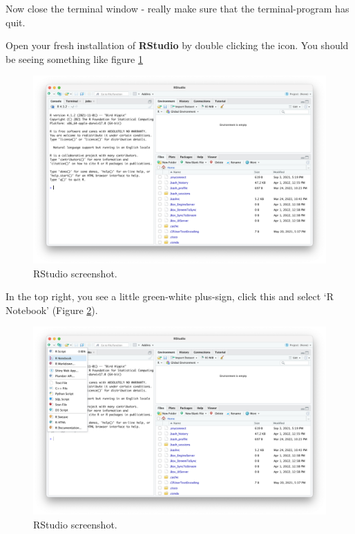 \documentclass[
]{book}
\begin{document}
Now close the terminal window - really make sure that the terminal-program has quit.

Open your fresh installation of \textbf{RStudio} by double clicking the icon. You should be seeing something like figure \ref{fig:rstudioscreenshot}

\begin{figure}[H]

{\centering \includegraphics[width=0.85\linewidth]{img/rstudio-screenshot} 

}

\caption{RStudio screenshot.}\label{fig:rstudioscreenshot}
\end{figure}

In the top right, you see a little green-white plus-sign, click this and select `R Notebook' (Figure \ref{fig:rstudioscreenshotcreatenotebook}).

\begin{figure}[H]

{\centering \includegraphics[width=0.85\linewidth]{img/rstudio-screenshot-create-notebook} 

}

\caption{RStudio screenshot.}\label{fig:rstudioscreenshotcreatenotebook}
\end{figure}
\end{document}
